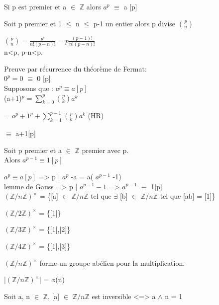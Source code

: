 \begin{thm}
	Si p est premier et a $\in$ $\mathbb{Z}$ alors $a^{p}$ $\equiv$ a [p]
\end{thm}
\begin{lem}
	Soit p premier et 1 $\leq$ n $\leq$ p-1 un entier alors p divise $\binom{p}{n}$
\end{lem}
\begin{dem}
	$\binom{p}{n} = \frac{p!}{n!(p-n)!} = p\frac{(p-1)!}{n!(p-n)!}$\\
	n<p, p-n<p.
\end{dem}
\begin{dem}
	Preuve par récurrence du théorème de Fermat:\\
	$0^{p} = 0$ $\equiv$ 0 [p]\\
	Supposons que : $a^{p} \equiv a[p]$\\
	(a+1)$^{p}  = \sum_{k=0}^{p} \binom{p}{k} a^{k}$
	
				= $a ^{p} + 1^{p} + \sum_{k=1}^{p-1} \binom{p}{k} a ^{k}$  (HR)
				
				$\equiv$ a+1[p]
\end{dem}
\begin{cor}
	Soit p premier et a $\in$ $\mathbb{Z}$ premier avec p.\\
	Alors $a^{p-1}\equiv 1 [p]$
\end{cor}
\begin{dem}
	$a^{p} \equiv a[p]$ => p | $a^{p}$ -a = a( $a^{p-1}$ -1)\\
	lemme de Gauss => p | $a^{p-1} -1$ => $a^{p-1}$ $\equiv$ 1[p]\\
	
	$(\mathbb{Z}/n\mathbb{Z})^{\times}$ = \{[a] $\in$ $\mathbb{Z}/n\mathbb{Z}$ tel que $\exists$ [b] $\in$ $\mathbb{Z}/n\mathbb{Z}$ tel que [ab] = [1]\}
\end{dem}
\begin{ex}
	$(\mathbb{Z}/2\mathbb{Z})^{\times}$ = \{[1]\}
	
	$(\mathbb{Z}/3\mathbb{Z})^{\times}$ = \{[1],[2]\}
	
	$(\mathbb{Z}/4\mathbb{Z})^{\times}$ = \{[1],[3]\}
\end{ex}
\begin{prop}
	$(\mathbb{Z}/n\mathbb{Z})^{\times}$ forme un groupe abélien pour la multiplication.
\end{prop}
\begin{prop}
	|$(\mathbb{Z}/n\mathbb{Z})^{\times}$| = $\phi$(n)
\end{prop}
\begin{lem}
	Soit a, n $\in$ $\mathbb{Z}$, [a] $\in$ $\mathbb{Z}/n\mathbb{Z}$ est inversible <=> a $\wedge$ n = 1
\end{lem}
